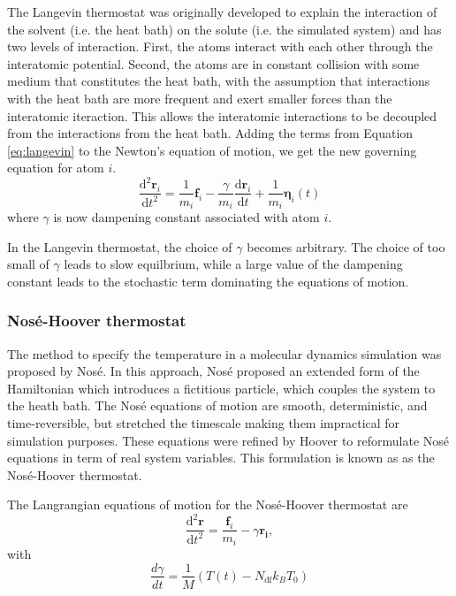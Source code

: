 The Langevin thermostat\cite{grest1986_langevin} was originally developed to explain the interaction of the solvent (i.e. the heat bath) on the solute (i.e. the simulated system) and has two levels of interaction.  First, the atoms interact with each other through the interatomic potential.  Second, the atoms are in constant collision with some medium that constitutes the heat bath, with the assumption that interactions with the heat bath are more frequent and exert smaller forces than the interatomic iteraction.  This allows the  interatomic interactions to be decoupled from the interactions from the heat bath.  Adding the terms from Equation \ref{eq:langevin} to the Newton's equation of motion, we get the new governing equation for atom $i$.
\begin{equation}
  \label{eq:langevin_eos}
  \frac{\mathrm{d}^2 \bm{r}_i}
	     {\mathrm{d} t^2}
  =
  \frac{1}{m_i} \bm{f}_i
  - \frac{\gamma}
	       {m_i}
	  \frac{\mathrm{d} \bm{r}_i}
		     {\mathrm{d} t}
  + \frac{1}{m_i} \bm{\eta}_i(t)
\end{equation}
where $\gamma$ is now dampening constant associated with atom $i$.

In the Langevin thermostat, the choice of $\gamma$ becomes arbitrary.  The choice of too small of $\gamma$ leads to slow equilbrium, while a large value of the dampening constant leads to the stochastic term dominating the equations of motion.

\subsubsection{Nos\'e-Hoover thermostat}
The method to specify the temperature in a molecular dynamics simulation was proposed by Nos\'e\cite{nose1984_npt_1,nose1984_npt_2}.  In this approach, Nos\'e proposed an extended form of the Hamiltonian which introduces a fictitious particle, which couples the system to the heath bath.  The Nos\'e equations of motion are smooth, deterministic, and time-reversible, but stretched the timescale making them impractical for simulation purposes.  These equations were refined by Hoover\cite{hoover1985_npt} to reformulate Nos\'e equations in term of real system variables.  This formulation is known as as the Nos\'e-Hoover thermostat.

The Langrangian equations of motion for the Nos\'e-Hoover thermostat are
\begin{equation}
  \label{eq:nose_hoover_1}
  \frac{\mathrm{d}^2 \bm{r} }
       {\mathrm{d} t^2 }
  =
  \frac{\bm{f}_i}
	     {m_i}
	- \gamma \bm{r_i},
\end{equation}
with
\begin{equation}
  \label{eq:nose_hoover_2}
  \frac{d\gamma}{dt}
  =
  \frac{1}{M}
   \left(
       T(t) - N_{\mathrm{df}} k_B T_0
   \right)
\end{equation}

